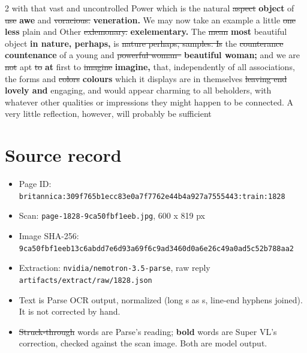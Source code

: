 \documentclass[10pt]{article}
\begin{document}
\begin{multicols}{2}
with that vast and uncontrolled Power which is the natural \sout{aspect} \textbf{object} of \sout{use} \textbf{awe} and \sout{voracious.} \textbf{veneration.} We may now take an example a little \sout{one} \textbf{less} plain and Other \sout{exlemonary.} \textbf{exelementary.} The \sout{mean} \textbf{most} beautiful object \textbf{in nature, perhaps,} is \sout{nature perhaps, samples. Is} the \sout{counterance} \textbf{countenance} of a young and \sout{powerful woman--} \textbf{beautiful woman;} and we are \sout{not} apt \sout{to} \textbf{at} first to \sout{imagine} \textbf{imagine,} that, independently of all associations, the forms and \sout{colors} \textbf{colours} which it displays are in themselves \sout{leaving end} \textbf{lovely and} engaging, and would appear charming to all beholders, with whatever other qualities or impressions they might happen to be connected. A very little reflection, however, will probably be sufficient
\end{multicols}
\section*{Source record}
\begin{itemize}
\item Page ID: \texttt{britannica:309f765b1ecc83e0a7f7762e44b4a927a7555443:train:1828}
\item Scan: \texttt{page-1828-9ca50fbf1eeb.jpg}, 600 x 819 px
\item Image SHA-256: \texttt{\small 9ca50fbf1eeb13c6abdd7e6d93a69f6c9ad3460d0a6e26c49a0ad5c52b788aa2}
\item Extraction: \texttt{nvidia/nemotron-3.5-parse}, raw reply \texttt{artifacts/extract/raw/1828.json}
\item Text is Parse OCR output, normalized (long s as s, line-end hyphens joined). It is not corrected by hand.
\item \sout{Struck-through} words are Parse's reading; \textbf{bold} words are Super VL's correction, checked against the scan image. Both are model output.
\end{itemize}
\end{document}
